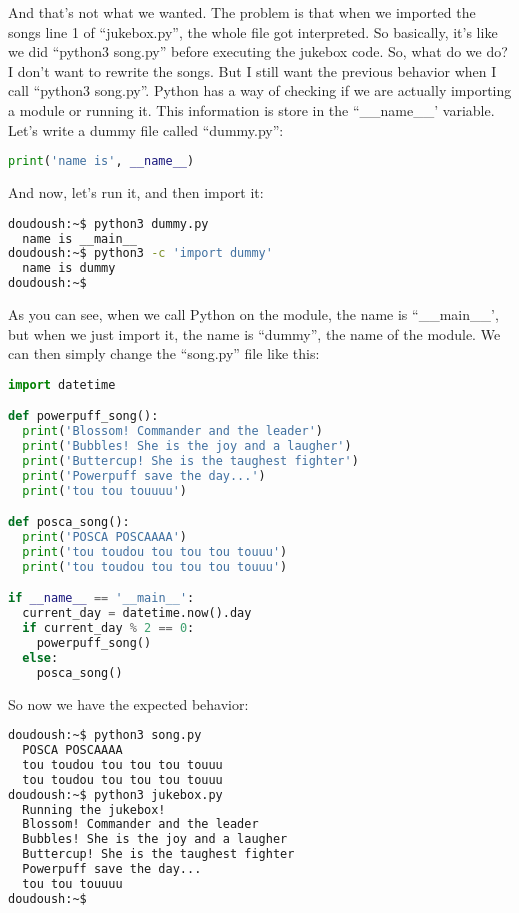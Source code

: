 And that's not what we wanted. The problem is that when we imported the songs line 1 of
``jukebox.py'', the whole file got interpreted. So basically, it's like we did ``python3 song.py''
before executing the jukebox code. So, what do we do? I don't want to rewrite the songs. But I
still want the previous behavior when I call ``python3 song.py''. Python has a way of checking
if we are actually importing a module or running it. This information is store in the
``\_\_name\_\_' variable. Let's write a dummy file called ``dummy.py'':

\begin{lstlisting}[language=python]
print('name is', __name__)
\end{lstlisting}

And now, let's run it, and then import it:

\begin{lstlisting}[language=bash]
doudoush:~$ python3 dummy.py
  name is __main__
doudoush:~$ python3 -c 'import dummy'
  name is dummy
doudoush:~$
\end{lstlisting}

As you can see, when we call Python on the module, the name is ``\_\_main\_\_',
but when we just import it, the name is ``dummy'', the name of the module. We can
then simply change the ``song.py'' file like this:

\begin{lstlisting}[language=python]
import datetime

def powerpuff_song():
  print('Blossom! Commander and the leader')
  print('Bubbles! She is the joy and a laugher')
  print('Buttercup! She is the taughest fighter')
  print('Powerpuff save the day...')
  print('tou tou touuuu')

def posca_song():
  print('POSCA POSCAAAA')
  print('tou toudou tou tou tou touuu')
  print('tou toudou tou tou tou touuu')

if __name__ == '__main__':
  current_day = datetime.now().day
  if current_day % 2 == 0:
    powerpuff_song()
  else:
    posca_song()
\end{lstlisting}

So now we have the expected behavior:

\begin{lstlisting}[language=bash]
doudoush:~$ python3 song.py
  POSCA POSCAAAA
  tou toudou tou tou tou touuu
  tou toudou tou tou tou touuu
doudoush:~$ python3 jukebox.py
  Running the jukebox!
  Blossom! Commander and the leader
  Bubbles! She is the joy and a laugher
  Buttercup! She is the taughest fighter
  Powerpuff save the day...
  tou tou touuuu
doudoush:~$
\end{lstlisting}

